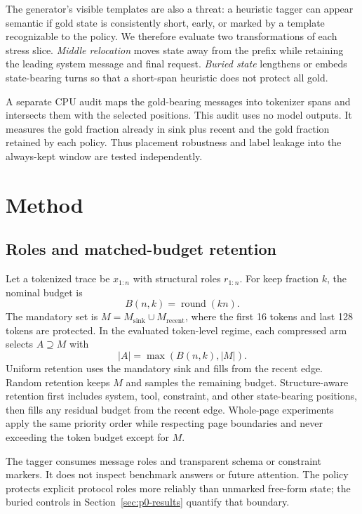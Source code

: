 \documentclass[10pt]{article}
\begin{document}
The generator's visible templates are also a threat: a heuristic tagger can
appear semantic if gold state is consistently short, early, or marked by a
template recognizable to the policy.  We therefore evaluate two transformations
of each stress slice.  \emph{Middle relocation} moves state away from the prefix
while retaining the leading system message and final request.  \emph{Buried
state} lengthens or embeds state-bearing turns so that a short-span heuristic
does not protect all gold.

A separate CPU audit maps the gold-bearing messages into tokenizer spans and
intersects them with the selected positions.  This audit uses no model outputs.
It measures the gold fraction already in sink plus recent and the gold fraction
retained by each policy.  Thus placement robustness and label leakage into the
always-kept window are tested independently.

\section{Method}
\label{sec:method}

\subsection{Roles and matched-budget retention}
\label{sec:retention-method}

Let a tokenized trace be $x_{1:n}$ with structural roles $r_{1:n}$.  For keep
fraction $k$, the nominal budget is
\begin{equation}
  B(n,k)=\operatorname{round}(kn).
  \label{eq:budget}
\end{equation}
The mandatory set is $M=M_{\mathrm{sink}}\cup M_{\mathrm{recent}}$, where the
first 16 tokens and last 128 tokens are protected.  In the evaluated token-level
regime, each compressed arm selects $A\supseteq M$ with
\begin{equation}
  |A|=\max(B(n,k),|M|).
  \label{eq:matched}
\end{equation}
Uniform retention uses the mandatory sink and fills from the recent edge.
Random retention keeps $M$ and samples the remaining budget.  Structure-aware
retention first includes system, tool, constraint, and other state-bearing
positions, then fills any residual budget from the recent edge.  Whole-page
experiments apply the same priority order while respecting page boundaries and
never exceeding the token budget except for $M$.

The tagger consumes message roles and transparent schema or constraint markers.
It does not inspect benchmark answers or future attention.  The policy protects
explicit protocol roles more reliably than unmarked free-form state; the buried
controls in Section~\ref{sec:p0-results} quantify that boundary.
\end{document}
